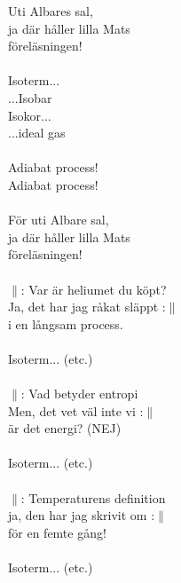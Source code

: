 \documentclass[a6paper, 10pt, twoside]{article}
\begin{document}
\begin{center}
\end{center}
\begin{lyrics}
Uti Albares sal,\\
ja där håller lilla Mats\\
föreläsningen!\\
\vspace{-3pt} \\
Isoterm...\\
...Isobar\\
Isokor...\\
...ideal gas\\
\vspace{-3pt} \\
Adiabat process!\\
Adiabat process!\\
\vspace{-3pt} \\
För uti Albare sal, \\
ja där håller lilla Mats\\
föreläsningen!\\
\vspace{-3pt} \\
$\|$: Var är heliumet du köpt?\\
Ja, det har jag råkat släppt :$\|$\\
i en långsam process.\\
\vspace{-3pt} \\
Isoterm... (etc.)\\
\vspace{-3pt} \\
$\|$: Vad betyder entropi\\
Men, det vet väl inte vi :$\|$\\
är det energi? (NEJ)\\
\vspace{-3pt} \\
Isoterm... (etc.)\\
\vspace{-3pt} \\
$\|$: Temperaturens definition\\
ja, den har jag skrivit om :$\|$ \\
för en femte gång!\\
\vspace{-3pt} \\
Isoterm... (etc.)
\end{lyrics}
\end{document}
